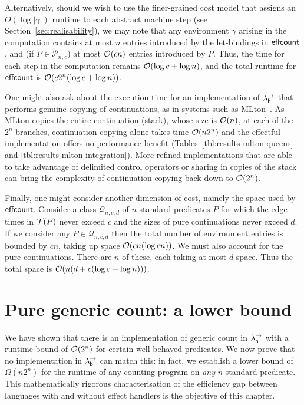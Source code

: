 \documentclass[12pt,phd,lfcs,twoside,openright,logo,leftchapter,normalheadings]{infthesis}
\theoremstyle{plain}
\theoremstyle{definition}
\begin{document}
Alternatively, should we wish to use the finer-grained cost model that
assigns an $O(\log |\gamma|)$ runtime to each abstract machine step
(see Section~\ref{sec:realisability}), we may note that any
environment $\gamma$ arising in the computation contains at most $n$
entries introduced by the let-bindings in $\mathsf{effcount}$, and (if $P \in
\mathcal{P}_{n,c}$) at most $\mathcal{O}(cn)$ entries introduced by $P$.
Thus, the time for each step in the computation remains $\mathcal{O}(\log c
+ \log n)$, and the total runtime for $\mathsf{effcount}$ is $\mathcal{O}(c 2^n (\log
c + \log n))$.

One might also ask about the execution time for an implementation of
$\lambda^\rightarrow_{\mathsf{h}}$ that performs genuine copying of continuations, as in systems
such as MLton~\cite{Fluet20}.
%
As MLton copies the entire continuation (stack), whose size is
$\mathcal{O}(n)$, at each of the $2^n$ branches, continuation copying alone
takes time $\mathcal{O}(n2^n)$ and the effectful implementation offers no
performance benefit (Tables~\ref{tbl:results-mlton-queens} and
\ref{tbl:results-mlton-integration}).
%
More refined implementations \citep{FarvardinR20, FlattD20} that are
able to take advantage of delimited control operators or sharing in
copies of the stack can bring the complexity of continuation copying
back down to $\mathcal{O}(2^n)$.

Finally, one might consider another dimension of cost, namely the
space used by $\mathsf{effcount}$.
%
Consider a class $\mathcal{Q}_{n,c,d}$ of $n$-standard predicates $P$
for which the edge times in $\mathcal{T}(P)$ never exceed $c$ and the sizes of
pure continuations never exceed $d$.
%
If we consider any $P \in \mathcal{Q}_{n,c,d}$ then the total number
of environment entries is bounded by $cn$, taking up space
$\mathcal{O}(cn(\log cn))$.
%
We must also account for the pure continuations. There are $n$ of
these, each taking at most $d$ space.
%
Thus the total space is $\mathcal{O}(n(d + c(\log c + \log n)))$.

\section{Pure generic count: a lower bound}
\label{sec:pure-counting}

\newcommand{\naivecount}{\dec{naivecount}}
\newcommand{\lazycount}{\dec{lazycount}}
\newcommand{\BergerCount}{\dec{BergerCount}}
\newcommand{\bestshot}{\dec{bestshot}}
\newcommand{\FF}{\mathcal{F}}
\newcommand{\GG}{\mathcal{G}}

We have shown that there is an implementation of generic count in
$\lambda^\rightarrow_{\mathsf{h}}$ with a runtime bound of $\mathcal{O}(2^n)$ for certain well-behaved
predicates. We now prove that no implementation in $\lambda^\rightarrow_{\mathsf{b}}$ can match
this: in fact, we establish a lower bound of $\Omega(n2^n)$ for the
runtime of any counting program on \emph{any} $n$-standard predicate.
This mathematically rigorous characterisation of the efficiency gap
between languages with and without effect handlers is the objective of
this chapter.
\end{document}
